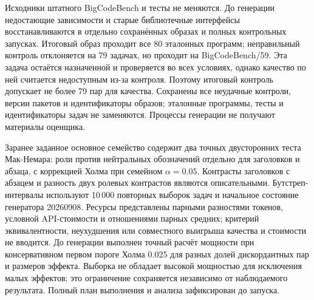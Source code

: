 Исходники штатного BigCodeBench и тесты не меняются. До генерации недостающие зависимости и старые библиотечные интерфейсы восстанавливаются в отдельно сохранённых образах и полных контрольных запусках. Итоговый образ проходит все 80 эталонных программ; неправильный контроль отклоняется на 79 задачах, но проходит на BigCodeBench/59. Эта задача остаётся назначенной и проверяется во всех условиях, однако качество по ней считается недоступным из-за контроля. Поэтому итоговый контроль допускает не более 79 пар для качества. Сохранены все неудачные контроли, версии пакетов и идентификаторы образов; эталонные программы, тесты и идентификаторы задач не заменяются. Процессы генерации не получают материалы оценщика.

Заранее заданное основное семейство содержит два точных двусторонних теста Мак-Немара: роли против нейтральных обозначений отдельно для заголовков и абзаца, с коррекцией Холма при семейном $\alpha=0.05$. Контрасты заголовков с абзацем и разность двух ролевых контрастов являются описательными. Бутстреп-интервалы используют 10\,000 повторных выборок задач и начальное состояние генератора 20260908. Ресурсы представлены парными разностями токенов, условной API-стоимости и отношениями парных средних; критерий эквивалентности, неухудшения или совместного выигрыша качества и стоимости не вводится. До генерации выполнен точный расчёт мощности при консервативном первом пороге Холма 0.025 для разных долей дискордантных пар и размеров эффекта. Выборка не обладает высокой мощностью для исключения малых эффектов; это ограничение сохраняется независимо от наблюдаемого результата. Полный план выполнения и анализа зафиксирован до запуска.
